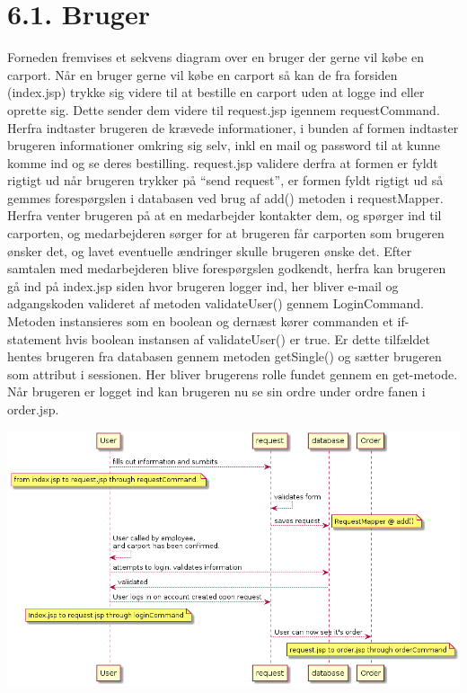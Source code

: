 \documentclass[11pt]{report}
\begin{document}
\section*{6.1. Bruger}
Forneden fremvises et sekvens diagram over en bruger der gerne vil købe en carport. Når en bruger gerne vil købe en carport så kan de fra forsiden (index.jsp) trykke sig videre til at bestille en carport uden at logge ind eller oprette sig. Dette sender dem videre til request.jsp igennem requestCommand. Herfra indtaster brugeren de krævede informationer, i bunden af formen indtaster brugeren informationer omkring sig selv, inkl en mail og password til at kunne komme ind og se deres bestilling. request.jsp validere derfra at formen er fyldt rigtigt ud når brugeren trykker på “send request”, er formen fyldt rigtigt ud så gemmes forespørgslen i databasen ved brug af add() metoden i requestMapper. 
Herfra venter brugeren på at en medarbejder kontakter dem, og spørger ind til carporten, og medarbejderen sørger for at brugeren får carporten som brugeren ønsker det, og lavet eventuelle ændringer skulle brugeren ønske det. 
Efter samtalen med medarbejderen blive forespørgslen godkendt, herfra
kan brugeren gå ind på index.jsp siden hvor brugeren logger ind, her
bliver e-mail og adgangskoden valideret af metoden validateUser()
gennem LoginCommand. Metoden instansieres som en boolean og dernæst
kører commanden et if-statement hvis boolean instansen af
validateUser() er true. Er dette tilfældet hentes brugeren fra
databasen gennem metoden getSingle() og sætter brugeren som attribut i
sessionen. Her bliver brugerens rolle fundet gennem en get-metode. Når
brugeren er logget ind kan brugeren nu se sin ordre under ordre fanen
i order.jsp.
\begin{center}
\includegraphics[width=15cm]{BrugerKob.png}
\end{center}
\newpage
\end{document}
